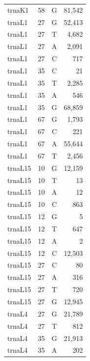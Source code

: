 \documentclass[12pt]{rockefeller}
\begin{document}
{\begin{center}
\begin{supertabular}{|l|r|c|r|}
  trnaK1 &        58 &          G &     81,542 \\
  trnaL1 &        27 &          G &     52,413 \\
  trnaL1 &        27 &          T &      4,682 \\
  trnaL1 &        27 &          A &      2,091 \\
  trnaL1 &        27 &          C &        717 \\
  trnaL1 &        35 &          C &         21 \\
  trnaL1 &        35 &          T &      2,285 \\
  trnaL1 &        35 &          A &        546 \\
  trnaL1 &        35 &          G &     68,859 \\
  trnaL1 &        67 &          G &      1,793 \\
  trnaL1 &        67 &          C &        221 \\
  trnaL1 &        67 &          A &     55,644 \\
  trnaL1 &        67 &          T &      2,456 \\
 trnaL15 &        10 &          G &     12,159 \\
 trnaL15 &        10 &          T &         13 \\
 trnaL15 &        10 &          A &         12 \\
 trnaL15 &        10 &          C &        863 \\
 trnaL15 &        12 &          G &          5 \\
 trnaL15 &        12 &          T &        647 \\
 trnaL15 &        12 &          A &          2 \\
 trnaL15 &        12 &          C &     12,503 \\
 trnaL15 &        27 &          C &         80 \\
 trnaL15 &        27 &          A &        316 \\
 trnaL15 &        27 &          T &        720 \\
 trnaL15 &        27 &          G &     12,945 \\
  trnaL4 &        27 &          G &     21,789 \\
  trnaL4 &        27 &          T &        812 \\
  trnaL4 &        35 &          G &     21,913 \\
  trnaL4 &        35 &          A &        202 \\

\end{supertabular}
\end{center}}
\end{document}
